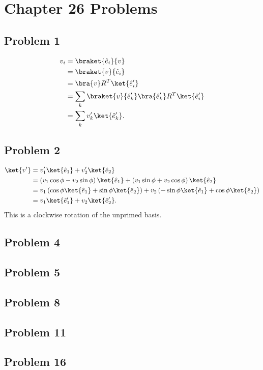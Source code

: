 \documentclass[10pt]{mypackage}
\begin{document}
\RaggedRight
\section{Chapter 26 Problems}%
\subsection{Problem 1}%
\begin{align*}
  v_i &= \braket{\hat{e}_i}{v}\\
      &= \braket{v}{\hat{e}_i}\\
      &= \bra{v}R^{T}\ket{\hat{e}_i'}\\
      &= \sum_{k}\braket{v}{\hat{e}_k'}\bra{\hat{e}_k'}R^{T}\ket{\hat{e}_i'}\\
      &= \sum_{k}v_k'\ket{\hat{e}_k'}.
\end{align*}
\subsection{Problem 2}%
\begin{align*}
  \ket{v'} &= v_1'\ket{\hat{e}_1} + v_2'\ket{\hat{e}_2}\\
           &= \left(v_1\cos\phi -v_2\sin\phi\right)\ket{\hat{e}_1} + \left(v_1\sin\phi + v_2\cos\phi\right)\ket{\hat{e}_2}\\
           &= v_1\left(\cos\phi\ket{\hat{e}_1} + \sin\phi\ket{\hat{e}_2}\right) + v_2\left(-\sin\phi\ket{\hat{e}_1} + \cos\phi\ket{\hat{e}_2}\right)\\
           &= v_1\ket{\hat{e}_1'} + v_2\ket{\hat{e}_2'}.
\end{align*}
This is a clockwise rotation of the unprimed basis.
\subsection{Problem 4}%
\subsection{Problem 5}%
\subsection{Problem 8}%
\subsection{Problem 11}%
\subsection{Problem 16}%
\end{document}
